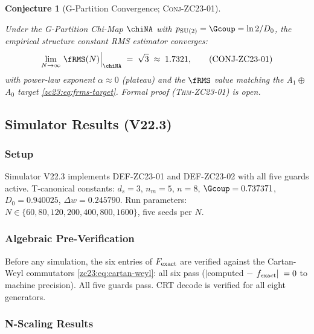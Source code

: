 \documentclass[12pt, a4paper]{article}
\newtheorem{conjecture}{Conjecture}[section]
\begin{document}
\begin{conjecture}[G-Partition Convergence; \textsc{Conj-ZC23-01}]
\label{zc23:conj:main}
\begin{derivedbox}[title={CONJ-ZC23-01 (Candidate)}]
Under the G-Partition Chi-Map $\chiNA$ with
$p_{\rm SU(2)} = \Gcoup = \ln 2/D_0$,
the empirical structure constant RMS estimator converges:
\begin{equation}
  \lim_{N\to\infty}\, \fRMS(N)\Big|_{\chiNA}
  \;=\; \sqrt{3} \;\approx\; 1.7321,
  \tag{CONJ-ZC23-01}
\end{equation}
with power-law exponent $\alpha \approx 0$ (plateau)
and the $\fRMS$ value matching the A$_1\oplus$A$_0$ target
\eqref{zc23:eq:frms-target}.
Formal proof (\textsc{Thm-ZC23-01}) is open.
\end{derivedbox}
\end{conjecture}

\subsection{Simulator Results (V22.3)}
\label{zc23:sec:results}

\subsubsection{Setup}

Simulator V22.3 implements DEF-ZC23-01 and DEF-ZC23-02 with
all five guards active.
T-canonical constants: $d_s=3$, $n_m=5$, $n=8$, $\Gcoup=0.737371$,
$D_0=0.940025$, $\Delta w = 0.245790$.
Run parameters: $N\in\{60,80,120,200,400,800,1600\}$, five seeds per $N$.

\subsubsection{Algebraic Pre-Verification}

Before any simulation, the six entries of $F_{\rm exact}$
are verified against the Cartan-Weyl commutators \eqref{zc23:eq:cartan-weyl}:
all six pass ($|$computed $-$ $f_{\rm exact}|\;=0$ to machine precision).
All five guards pass. CRT decode is verified for all eight generators.

\subsubsection{N-Scaling Results}
\end{document}
